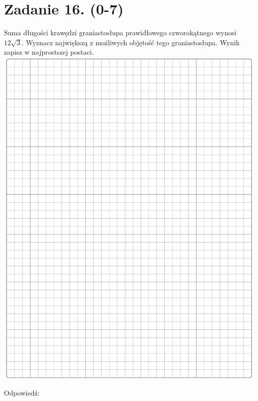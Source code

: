 \documentclass[10pt]{article}
\begin{document}
\section*{Zadanie 16. (0-7)}
Suma długości krawędzi graniastosłupa prawidłowego czworokątnego wynosi \(12 \sqrt{3}\). Wyznacz największą z możliwych objętość tego graniastosłupa. Wynik zapisz w najprostszej postaci.\\
\includegraphics[max width=\textwidth, center]{2024_11_21_e30d1f37bf0e3631c088g-15}

Odpowiedź:
\end{document}

